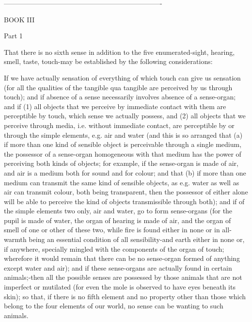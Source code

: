 ----------------------------------------------------------------------

BOOK III

Part 1 

That there is no sixth sense in addition to the five enumerated-sight,
hearing, smell, taste, touch-may be established by the following considerations:

If we have actually sensation of everything of which touch can give
us sensation (for all the qualities of the tangible qua tangible are
perceived by us through touch); and if absence of a sense necessarily
involves absence of a sense-organ; and if (1) all objects that we
perceive by immediate contact with them are perceptible by touch,
which sense we actually possess, and (2) all objects that we perceive
through media, i.e. without immediate contact, are perceptible by
or through the simple elements, e.g. air and water (and this is so
arranged that (a) if more than one kind of sensible object is perceivable
through a single medium, the possessor of a sense-organ homogeneous
with that medium has the power of perceiving both kinds of objects;
for example, if the sense-organ is made of air, and air is a medium
both for sound and for colour; and that (b) if more than one medium
can transmit the same kind of sensible objects, as e.g. water as well
as air can transmit colour, both being transparent, then the possessor
of either alone will be able to perceive the kind of objects transmissible
through both); and if of the simple elements two only, air and water,
go to form sense-organs (for the pupil is made of water, the organ
of hearing is made of air, and the organ of smell of one or other
of these two, while fire is found either in none or in all-warmth
being an essential condition of all sensibility-and earth either in
none or, if anywhere, specially mingled with the components of the
organ of touch; wherefore it would remain that there can be no sense-organ
formed of anything except water and air); and if these sense-organs
are actually found in certain animals;-then all the possible senses
are possessed by those animals that are not imperfect or mutilated
(for even the mole is observed to have eyes beneath its skin); so
that, if there is no fifth element and no property other than those
which belong to the four elements of our world, no sense can be wanting
to such animals. 

